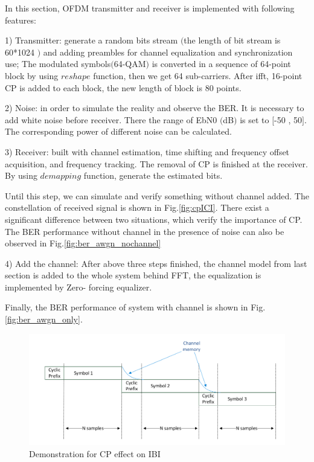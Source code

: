 \documentclass[a4paper]{article}
\begin{document}
 In this section, OFDM transmitter and receiver is implemented with following features:
 
  1) Transmitter: generate a random bits stream $($the length of bit stream is 60*1024 $)$ and adding preambles for channel equalization and synchronization use;  The modulated symbols$($64-QAM$)$ is converted in a sequence of 64-point block by using $reshape$ function, then we get 64 sub-carriers. After ifft, 16-point CP is added to each block, the new length of block is 80 points. 
  
  2) Noise: in order to simulate the reality and observe the BER. It is necessary to add white noise before receiver. There the range of  EbN0 $($dB$)$ is set to $[$-50 , 50$]$. The corresponding power of different noise can be calculated. 
  
  3) Receiver:  built with channel estimation, time shifting and frequency offset acquisition, and frequency tracking. The removal of CP is finished at the receiver.  By using  $demapping$ function, generate the estimated bits. 
  
   Until this step, we can simulate and verify something without channel added. The constellation of received signal is shown in Fig.\ref{fig:cpICI}. There exist a significant difference between two situations, which verify the importance of CP. The BER performance without channel in the presence of noise can also be observed in Fig.\ref{fig:ber_awgn_nochannel}
   
   4) Add the channel: After above three steps finished, the channel model from last section is added to the whole system behind FFT, the equalization is implemented by Zero- forcing equalizer.
   
   Finally, the BER performance of system with channel is shown in Fig.\ref{fig:ber_awgn_only}.

      \begin{figure}
		\centering
		\includegraphics[scale=0.45]{figures/ibi_show.png}
		\vspace{-0.2cm}
		\centering
		\caption{Demonstration for CP effect on IBI}
		\label{fig:cpIBI}
	\end{figure} 
    
\end{document}

